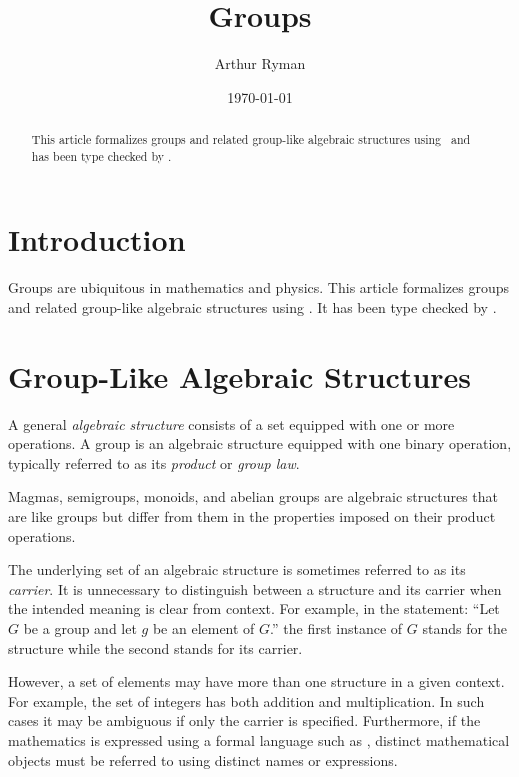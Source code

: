 \documentclass{amsart}
\begin{document}
\title{Groups}
\author{Arthur Ryman}
\date{\today}

\begin{abstract}
	This article formalizes groups and related group-like algebraic structures using 
	\ZN\ and has been type checked by \fuzz.
\end{abstract}

\maketitle

\tableofcontents

\section{Introduction}

Groups are ubiquitous in mathematics and physics.
This article formalizes groups and related group-like algebraic structures using 
\ZN\cite{spivey-zrm}.
It has been type checked by \fuzz\cite{spivey-fm}.

\section{Group-Like Algebraic Structures}

A general \textit{algebraic structure} consists of a set equipped with one or more operations.
A group is an algebraic structure equipped with one binary operation, typically referred to
as its \textit{product} or \textit{group law}.

Magmas, semigroups, monoids, and abelian groups are 
algebraic structures that are like groups but differ from them 
in the properties imposed on their product operations.

The underlying set of an algebraic structure is sometimes referred to as its \textit{carrier}.
It is unnecessary to distinguish between a structure and its carrier
when the intended meaning is clear from context.
For example, in the statement:  
``Let $G$ be a group and let $g$ be an element of $G$.''
the first instance of $G$ stands for the structure while the second stands for its carrier.

However, a set of elements may have more than one structure in a given context.
For example, the set of integers has both addition and multiplication.
In such cases it may be ambiguous if only the carrier is specified.
Furthermore, if the mathematics is expressed using a formal language such as \ZN, 
distinct mathematical objects
must be referred to using distinct names or expressions.
\end{document}

